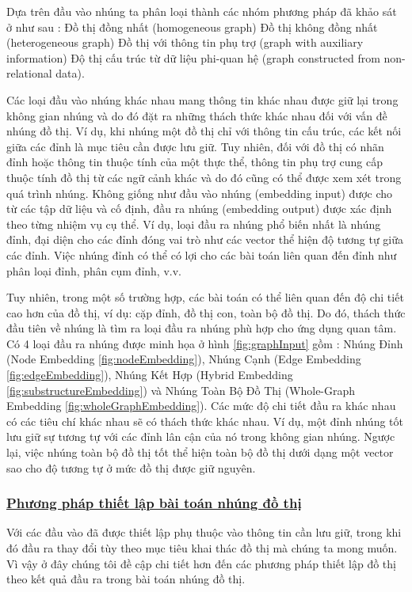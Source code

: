 Dựa trên đầu vào nhúng ta phân loại thành các nhóm phương pháp đã khảo sát ở \cite{cai2018comprehensive} như sau : 
Đồ thị đồng nhất (homogeneous graph)
Đồ thị không đồng nhất (heterogeneous graph)
Đồ thị với thông tin phụ trợ (graph with auxiliary information)
Độ thị cấu trúc từ dữ liệu phi-quan hệ (graph constructed from non-relational data).

Các loại đầu vào nhúng khác nhau mang thông tin khác nhau được giữ lại trong không gian nhúng và do đó đặt ra những thách thức khác nhau đối với vấn đề nhúng đồ thị. 
Ví dụ, khi nhúng một đồ thị chỉ với thông tin cấu trúc, các kết nối giữa các đỉnh là mục tiêu cần được lưu giữ. Tuy nhiên, đối với đồ thị có nhãn đỉnh hoặc thông tin thuộc tính của một thực thể, thông tin phụ trợ cung cấp thuộc tính đồ thị từ các ngữ cảnh khác và do đó cũng có thể được xem xét trong quá trình nhúng. Không giống như đầu vào nhúng (embedding input) được cho từ các tập dữ liệu và cố định, đầu ra nhúng (embedding output) được xác định theo từng nhiệm vụ cụ thể.
Ví dụ, loại đầu ra nhúng phổ biến nhất là nhúng đỉnh, đại diện cho các đỉnh đóng vai trò như các vector thể hiện độ tương tự giữa các đỉnh. Việc nhúng đỉnh có thể có lợi cho các bài toán liên quan đến đỉnh như phân loại đỉnh, phân cụm đỉnh, v.v.

Tuy nhiên, trong một số trường hợp, các bài toán có thể liên quan đến độ chi tiết cao hơn của đồ thị, ví dụ: cặp đỉnh, đồ thị con, toàn bộ đồ thị. Do đó, thách thức đầu tiên về nhúng là tìm ra loại đầu ra nhúng phù hợp cho ứng dụng quan tâm. Có 4 loại đầu ra nhúng được minh họa ở hình \ref{fig:graphInput} gồm : Nhúng Đỉnh (Node Embedding \ref{fig:nodeEmbedding}), Nhúng Cạnh (Edge Embedding \ref{fig:edgeEmbedding}), Nhúng Kết Hợp (Hybrid Embedding \ref{fig:substructureEmbedding}) và Nhúng Toàn Bộ Đồ Thị (Whole-Graph Embedding \ref{fig:wholeGraphEmbedding}). Các mức độ chi tiết đầu ra khác nhau có các tiêu chí khác nhau sẽ có thách thức khác nhau. Ví dụ, một đỉnh nhúng tốt lưu giữ sự tương tự với các đỉnh lân cận của nó trong không gian nhúng. Ngược lại, việc nhúng toàn bộ đồ thị tốt thể hiện toàn bộ đồ thị dưới dạng một vector sao cho độ tương tự ở mức đồ thị được giữ nguyên.

\subsubsection{\underline{Phương pháp thiết lập bài toán nhúng đồ thị}}

Với các đầu vào đã được thiết lập phụ thuộc vào thông tin cần lưu giữ, trong khi đó đầu ra thay đổi tùy theo mục tiêu khai thác đồ thị mà chúng ta mong muốn. Vì vậy ở đây chúng tôi đề cập chi tiết hơn đến các phương pháp thiết lập đồ thị theo kết quả đầu ra trong bài toán nhúng đồ thị.


